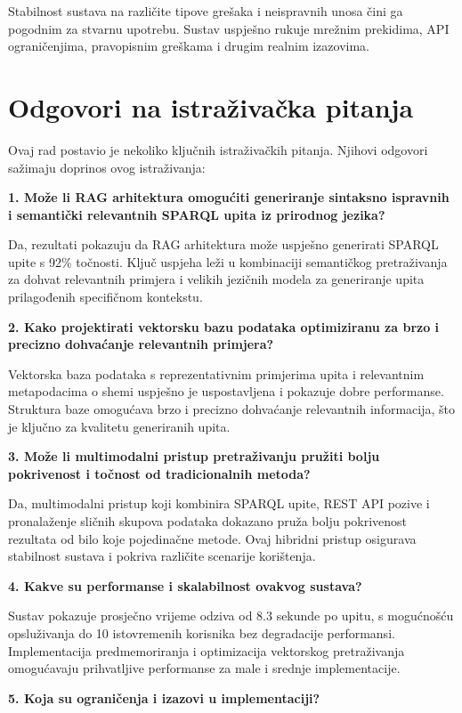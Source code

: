 Stabilnost sustava na različite tipove grešaka i neispravnih unosa čini ga pogodnim za stvarnu upotrebu. Sustav uspješno rukuje mrežnim prekidima, API ograničenjima, pravopisnim greškama i drugim realnim izazovima.

\section{Odgovori na istraživačka pitanja}

Ovaj rad postavio je nekoliko ključnih istraživačkih pitanja. Njihovi odgovori sažimaju doprinos ovog istraživanja:

\textbf{1. Može li RAG arhitektura omogućiti generiranje sintaksno ispravnih i semantički relevantnih SPARQL upita iz prirodnog jezika?}

Da, rezultati pokazuju da RAG arhitektura može uspješno generirati SPARQL upite s 92\% točnosti. Ključ uspjeha leži u kombinaciji semantičkog pretraživanja za dohvat relevantnih primjera i velikih jezičnih modela za generiranje upita prilagođenih specifičnom kontekstu.

\textbf{2. Kako projektirati vektorsku bazu podataka optimiziranu za brzo i precizno dohvaćanje relevantnih primjera?}

Vektorska baza podataka s reprezentativnim primjerima upita i relevantnim metapodacima o shemi uspješno je uspostavljena i pokazuje dobre performanse. Struktura baze omogućava brzo i precizno dohvaćanje relevantnih informacija, što je ključno za kvalitetu generiranih upita.

\textbf{3. Može li multimodalni pristup pretraživanju pružiti bolju pokrivenost i točnost od tradicionalnih metoda?}

Da, multimodalni pristup koji kombinira SPARQL upite, REST API pozive i pronalaženje sličnih skupova podataka dokazano pruža bolju pokrivenost rezultata od bilo koje pojedinačne metode. Ovaj hibridni pristup osigurava stabilnost sustava i pokriva različite scenarije korištenja.

\textbf{4. Kakve su performanse i skalabilnost ovakvog sustava?}

Sustav pokazuje prosječno vrijeme odziva od 8.3 sekunde po upitu, s mogućnošću opsluživanja do 10 istovremenih korisnika bez degradacije performansi. Implementacija predmemoriranja i optimizacija vektorskog pretraživanja omogućavaju prihvatljive performanse za male i srednje implementacije.

\textbf{5. Koja su ograničenja i izazovi u implementaciji?}

